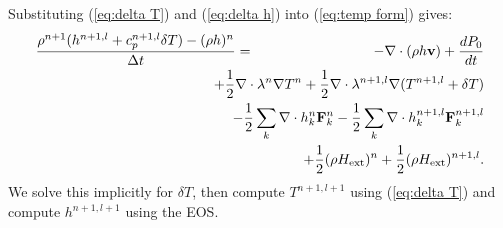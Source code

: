\documentclass[final]{siamltex}
\def\Fb {{\bf F}}
\def\vb {{\bf v}}
\def\Hext {H_{\rm ext}}
\def\half   {\frac{1}{2}}
\begin{document}
Substituting (\ref{eq:delta T}) and (\ref{eq:delta h}) into (\ref{eq:temp form}) gives:
\begin{eqnarray}
\frac{\rho^{n+1}(h^{n+1,l} + c_p^{n+1,l}\delta T) - (\rho h)^n}{\Delta t} &=& -\nabla\cdot(\rho h\vb) + \frac{dP_0}{dt}\nonumber\\
&&\hspace{-0.5in}+ \half\nabla\cdot\lambda^n\nabla T^n + \half\nabla\cdot\lambda^{n+1,l}\nabla(T^{n+1,l} + \delta T)\nonumber\\
&&\hspace{-0.5in} - \half\sum_k\nabla\cdot h_k^n \Fb_k^n - \half\sum_k\nabla\cdot h_k^{n+1,l} \Fb_k^{n+1,l}\nonumber\\
&&\hspace{-0.5in} + \half(\rho\Hext)^n + \half(\rho\Hext)^{n+1,l}.
\end{eqnarray}
We solve this implicitly for $\delta T$, then compute $T^{n+1,l+1}$
using (\ref{eq:delta T}) and compute $h^{n+1,l+1}$ using the EOS.
\end{document}
